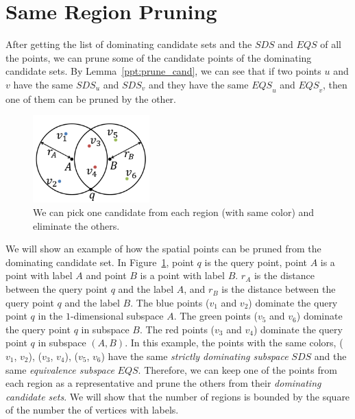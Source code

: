 \section{Same Region Pruning}
After getting the list of dominating candidate sets and the $\mathit{SDS}$ and $\mathit{EQS}$ of all the points, we can prune some of the candidate points of the dominating candidate sets. By Lemma~\ref{ppt:prune_cand}, we can see that if two points $u$ and $v$ have the same $\mathit{SDS}_u$ and $\mathit{SDS}_v$ and they have the same $\mathit{EQS}_u$ and $\mathit{EQS}_v$, then one of them can be pruned by the other.

\begin{figure}[h]
    \centering
      \includegraphics[width=0.4\textwidth]{figs/Circle_Spatial_Example}
    \caption{We can pick one candidate from each region (with same color) and eliminate the others.}
    \label{fig:circle_example}
\end{figure}

We will show an example of how the spatial points can be pruned from the dominating candidate set. In Figure~\ref{fig:circle_example}, point $q$ is the query point, point $A$ is a point with label $A$ and point $B$ is a point with label $B$. $r_{A}$ is the distance between the query point $q$ and the label $A$, and $r_{B}$ is the distance between the query point $q$ and the label $B$. The blue points ($v_1$ and $v_2$) dominate the query point $q$ in the $1$-dimensional subspace $A$. The green points ($v_5$ and $v_6$) dominate the query point $q$ in subspace $B$. The red points ($v_3$ and $v_4$) dominate the query point $q$ in subspace $(A, B)$. In this example, the points with the same colors, ($v_1$, $v_2$), ($v_3$, $v_4$), ($v_5$, $v_6$) have the same \emph{strictly dominating subspace} $\mathit{SDS}$ and the same \emph{equivalence subspace} $\mathit{EQS}$. Therefore, we can keep one of the points from each region as a representative and prune the others from their \emph{dominating candidate sets}. We will show that the number of regions is bounded by the square of the number the of vertices with labels.

